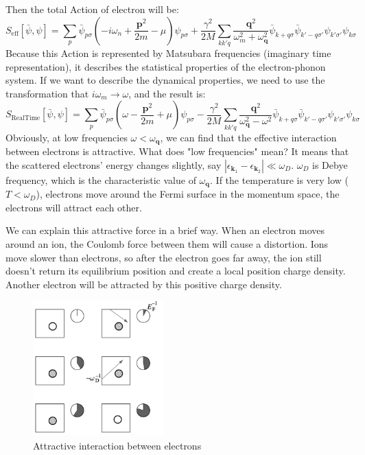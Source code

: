 \documentclass{article}
\newcommand{\mtp}{\mathbf{p}}
\newcommand{\mtq}{\mathbf{q}}
\newcommand{\mtk}{\mathbf{k}}
\begin{document}
Then the total Action of electron will be:
\begin{equation}
S_{\mathrm{eff}}[\bar{\psi},\psi] = \sum_{p}\bar{\psi}_{p\sigma}\left(-i\omega_n +\frac{\mtp^2}{2m}-\mu\right)\psi_{p\sigma} + \frac{\gamma^2}{2M}\sum_{kk'q} \frac{\mtq^2}{\omega_m^2 + \omega_\mtq^2} \bar{\psi}_{k+q\sigma}\bar{\psi}_{k'-q\sigma'}\psi_{k'\sigma'}\psi_{k\sigma}
\end{equation}
Because this Action is represented by Matsubara frequencies (imaginary time representation), it describes the statistical properties of the electron-phonon system. If we want to describe the dynamical properties, we need to use the transformation that $i\omega_m \rightarrow \omega$, and the result is:
\begin{equation}
S_{\mathrm{Real Time}}[\bar{\psi},\psi] = \sum_{p}\bar{\psi}_{p\sigma}\left(\omega-\frac{\mtp^2}{2m}+\mu\right)\psi_{p\sigma} - \frac{\gamma^2}{2M}\sum_{kk'q}\frac{\mtq^2}{\omega_\mtq^2-\omega^2} \bar{\psi}_{k+q\sigma}\bar{\psi}_{k'-q\sigma'}\psi_{k'\sigma'}\psi_{k\sigma}
\end{equation}
Obviously, at low frequencies $\omega < \omega_\mtq$, we can find that the effective interaction between electrons is attractive. What does "low frequencies" mean? It means that the scattered electrons' energy changes slightly, say $|\epsilon_{\mtk_1}-\epsilon_{\mtk_2}|\ll \omega_D$. $\omega_D$ is Debye frequency, which is the characteristic value of $\omega_\mtq$. If the temperature is very low ($T < \omega_D$), electrons move around the Fermi surface in the momentum space, the electrons will attract each other. 

We can explain this attractive force in a brief way. When an electron moves around an ion, the Coulomb force between them will cause a distortion. Ions move slower than electrons, so after the electron goes far away, the ion still doesn't return its equilibrium position and create a local position charge density. Another electron will be attracted by this positive charge density.
\begin{figure}[!htp]
\centering
\includegraphics[width=5cm]{./figures/pic1.png}
\caption{Attractive interaction between electrons}
\end{figure}
\end{document}
